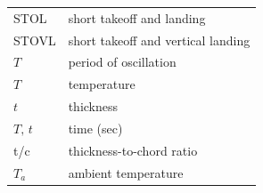 \documentclass[
]{book}
\begin{document}
\begin{longtable}[]{@{}ll@{}}
\begin{minipage}[t]{0.47\columnwidth}
STOL\strut
\end{minipage} & \begin{minipage}[t]{0.47\columnwidth}\raggedright
short takeoff and landing\strut
\end{minipage}\tabularnewline
\begin{minipage}[t]{0.47\columnwidth}\raggedright
STOVL\strut
\end{minipage} & \begin{minipage}[t]{0.47\columnwidth}\raggedright
short takeoff and vertical landing\strut
\end{minipage}\tabularnewline
\begin{minipage}[t]{0.47\columnwidth}\raggedright
\(T\)\strut
\end{minipage} & \begin{minipage}[t]{0.47\columnwidth}\raggedright
period of oscillation\strut
\end{minipage}\tabularnewline
\begin{minipage}[t]{0.47\columnwidth}\raggedright
\(T\)\strut
\end{minipage} & \begin{minipage}[t]{0.47\columnwidth}\raggedright
temperature\strut
\end{minipage}\tabularnewline
\begin{minipage}[t]{0.47\columnwidth}\raggedright
\(t\)\strut
\end{minipage} & \begin{minipage}[t]{0.47\columnwidth}\raggedright
thickness\strut
\end{minipage}\tabularnewline
\begin{minipage}[t]{0.47\columnwidth}\raggedright
\(T\text{, }t\)\strut
\end{minipage} & \begin{minipage}[t]{0.47\columnwidth}\raggedright
time (sec)\strut
\end{minipage}\tabularnewline
\begin{minipage}[t]{0.47\columnwidth}\raggedright
t/c\strut
\end{minipage} & \begin{minipage}[t]{0.47\columnwidth}\raggedright
thickness-to-chord ratio\strut
\end{minipage}\tabularnewline
\begin{minipage}[t]{0.47\columnwidth}\raggedright
\(T_a\)\strut
\end{minipage} & \begin{minipage}[t]{0.47\columnwidth}\raggedright
ambient temperature\strut

\end{minipage}
\end{longtable}
\end{document}
